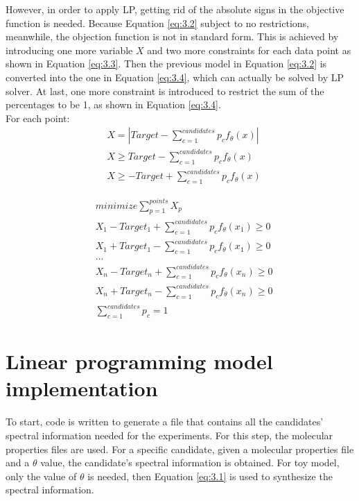 However, in order to apply LP, getting rid of the absolute signs in the objective function is needed. Because Equation \ref{eq:3.2} subject to no restrictions, meanwhile, the objection function is not in standard form. This is achieved by introducing one more variable $X$ and two more constraints for each data point as shown in Equation \ref{eq:3.3}. Then the previous model in Equation \ref{eq:3.2} is converted into the one in Equation \ref{eq:3.4}, which can actually be solved by LP solver. At last, one more constraint is introduced to restrict the sum of the percentages to be 1, as shown in Equation \ref{eq:3.4}. \\

For each point:
\begin{eqnarray} \label{eq:3.3}
& X = \left| Target-\displaystyle\sum^{candidates}_{c=1}p_{c}f_{\theta}(x) \right| \nonumber \\
&  X \geq Target-\displaystyle\sum^{candidates}_{c=1}p_{c}f_{\theta}(x)   \nonumber \\
& X \geq -Target+\displaystyle\sum^{candidates}_{c=1}p_{c}f_{\theta}(x)  
\end{eqnarray} 

\begin{eqnarray} \label{eq:3.4}
& minimize \displaystyle\sum^{points}_{p=1} X_p \nonumber \\
& X_1 - Target_1 + \displaystyle\sum^{candidates}_{c=1}p_{c}f_{\theta}(x_1) \geq 0 \nonumber \\
& X_1 + Target_1 - \displaystyle\sum^{candidates}_{c=1}p_{c}f_{\theta}(x_1) \geq 0 \nonumber \\
& ... \nonumber \\
& X_n - Target_n + \displaystyle\sum^{candidates}_{c=1}p_{c}f_{\theta}(x_n) \geq 0 \nonumber \\
& X_n + Target_n - \displaystyle\sum^{candidates}_{c=1}p_{c}f_{\theta}(x_n) \geq 0 \nonumber \\
& \displaystyle\sum^{candidates}_{c=1}p_{c} = 1 
\end{eqnarray} 

\section{Linear programming model implementation}






To start, code is written to generate a file that contains all the candidates' spectral information needed for the experiments. For this step, the molecular properties files are used. For a specific candidate, given a molecular properties file and a $\theta$ value, the candidate's spectral information is obtained. For toy model, only the value of $\theta$ is needed, then Equation \ref{eq:3.1} is used to synthesize the spectral information. \\

